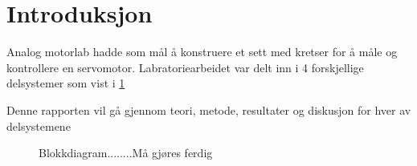\section{Introduksjon}\label{sec:intro}

Analog motorlab hadde som mål å konstruere et sett med kretser for å måle og kontrollere en servomotor. Labratoriearbeidet var delt inn i 4 forskjellige delsystemer som vist i \ref{fig:blokkdiagram}

Denne rapporten vil gå gjennom teori, metode, resultater og diskusjon for hver av delsystemene

\begin{figure}[b]
    \centering
    
    \caption{Blokkdiagram........Må gjøres ferdig}
    \label{fig:blokkdiagram}
\end{figure}












